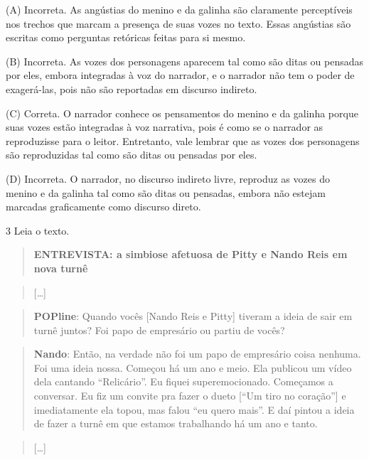(A) Incorreta. As angústias do menino e da galinha são claramente
perceptíveis nos trechos que marcam a presença de suas vozes no texto.
Essas angústias são escritas como perguntas retóricas feitas para si
mesmo.

(B) Incorreta. As vozes dos personagens aparecem tal como são ditas ou
pensadas por eles, embora integradas à voz do narrador, e o narrador não
tem o poder de exagerá-las, pois não são reportadas em discurso
indireto.

(C) Correta. O narrador conhece os pensamentos do menino e da galinha
porque suas vozes estão integradas à voz narrativa, pois é como se o
narrador as reproduzisse para o leitor. Entretanto, vale lembrar que as
vozes dos personagens são reproduzidas tal como são ditas ou pensadas
por eles.

(D) Incorreta. O narrador, no discurso indireto livre, reproduz as vozes
do menino e da galinha tal como são ditas ou pensadas, embora não
estejam marcadas graficamente como discurso direto.

\num{3} Leia o texto.

\begin{quote}
\textbf{ENTREVISTA: a simbiose afetuosa de Pitty e Nando Reis em nova
turnê}
\end{quote}

\begin{quote}
{[}\ldots{]}
\end{quote}

\begin{quote}
\textbf{POPline}: Quando vocês {[}Nando Reis e Pitty{]} tiveram a ideia
de sair em turnê juntos? Foi papo de empresário ou partiu de vocês?
\end{quote}

\begin{quote}
\textbf{Nando}: Então, na verdade não foi um papo de empresário coisa
nenhuma. Foi uma ideia nossa. Começou há um ano e meio. Ela publicou um
vídeo dela cantando ``Relicário''. Eu fiquei superemocionado. Começamos
a conversar. Eu fiz um convite pra fazer o dueto {[}``Um tiro no
coração''{]} e imediatamente ela topou, mas falou ``eu quero mais''. E
daí pintou a ideia de fazer a turnê em que estamos trabalhando há um ano
e tanto.
\end{quote}

\begin{quote}
{[}\ldots{]}
\end{quote}


